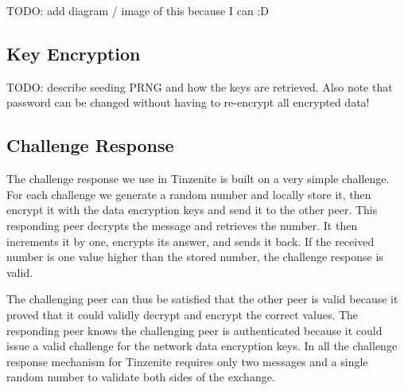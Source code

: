 TODO: add diagram / image of this because I can :D

\subsection{Key Encryption}
\label{sub:Key Encryption}

TODO: describe seeding PRNG and how the keys are retrieved.
Also note that password can be changed without having to re-encrypt all encrypted data!

\subsection{Challenge Response}
\label{sub:Challenge Response}

The challenge response we use in Tinzenite is built on a very simple challenge.
For each challenge we generate a random number and locally store it, then encrypt it with the data encryption keys and send it to the other peer.
This responding peer decrypts the message and retrieves the number.
It then increments it by one, encrypts its answer, and sends it back.
If the received number is one value higher than the stored number, the challenge response is valid.

The challenging peer can thus be satisfied that the other peer is valid because it proved that it could validly decrypt and encrypt the correct values.
The responding peer knows the challenging peer is authenticated because it could issue a valid challenge for the network data encryption keys.
In all the challenge response mechanism for Tinzenite requires only two messages and a single random number to validate both sides of the exchange.
